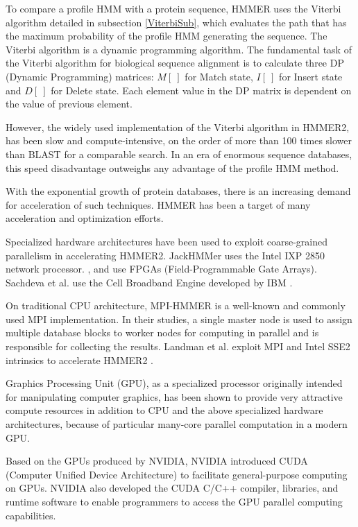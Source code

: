 To compare a profile HMM with a protein sequence, HMMER uses the Viterbi algorithm detailed in subsection \ref{ViterbiSub}, which evaluates the path that has the maximum probability of the profile HMM generating the sequence. The Viterbi algorithm is a dynamic programming algorithm.
The fundamental task of the Viterbi algorithm for biological sequence alignment is to calculate three DP (Dynamic Programming) matrices: $M[~]$ for Match state, $I[~]$ for Insert state and $D[~]$ for Delete state. Each element value in the DP matrix is dependent on the value of previous element.

However, the widely used implementation of the Viterbi algorithm in HMMER2, has been slow and compute-intensive, on the order of more than 100 times slower than BLAST for a comparable search. In an era of enormous sequence databases, this speed disadvantage outweighs any advantage of the profile HMM method.

With the exponential growth of protein databases, there is an increasing demand for acceleration of such techniques. HMMER has been a target of many acceleration and optimization efforts. 

Specialized hardware architectures have been used to exploit coarse-grained parallelism in accelerating HMMER2. JackHMMer \citep{Wun} uses the Intel IXP 2850 network processor. \citep{Maddimsetty}, \citep{Derrien} and \citep{Oliver} use FPGAs (Field-Programmable Gate Arrays). Sachdeva et al. use the Cell Broadband Engine developed by IBM \citep{Sachdeva}.

On traditional CPU architecture, MPI-HMMER \citep{Walters2006} is a well-known and commonly used MPI implementation. In their studies, a single master node is used to assign multiple database blocks to worker nodes for computing in parallel and is responsible for collecting the results. Landman et al. exploit MPI and Intel SSE2 intrinsics to accelerate HMMER2 \citep{Landman}.

Graphics Processing Unit (GPU), as a specialized processor originally intended for manipulating computer graphics, has been shown to provide very attractive compute resources in addition to CPU and the above specialized hardware architectures, because of particular many-core parallel computation in a modern GPU.

Based on the GPUs produced by NVIDIA, NVIDIA introduced CUDA (Computer Unified Device Architecture) to facilitate general-purpose computing on GPUs. NVIDIA also developed the CUDA C/C++ compiler, libraries, and runtime software to enable programmers to access the GPU parallel computing capabilities.

